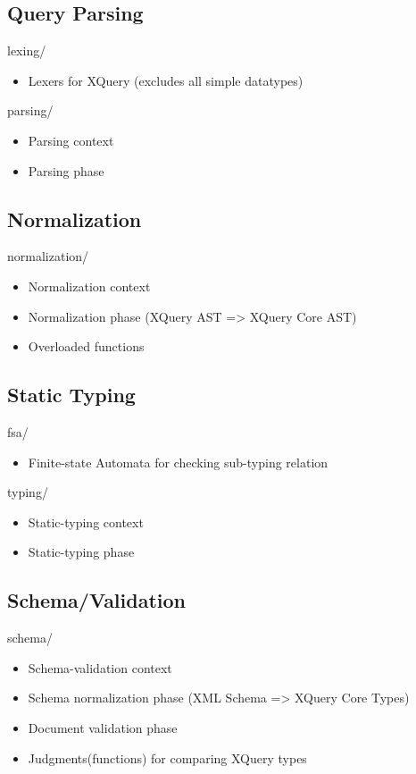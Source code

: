 \subsection{Query Parsing}
lexing/	    
\begin{itemize}
\item    Lexers for XQuery (excludes all simple datatypes)
\end{itemize}
parsing/	 
\begin{itemize}
\item    Parsing context
\item    Parsing phase
\end{itemize}

\subsection{Normalization}
normalization/
\begin{itemize}
\item    Normalization context
\item    Normalization phase (XQuery AST => XQuery Core AST)
\item    Overloaded functions
\end{itemize}

\subsection{Static Typing}

fsa/	    
\begin{itemize}
\item    Finite-state Automata for checking sub-typing relation
\end{itemize}
typing/
\begin{itemize}
\item    Static-typing context
\item    Static-typing phase
\end{itemize}

\subsection{Schema/Validation}
schema/
\begin{itemize}
\item   Schema-validation context
\item   Schema normalization phase (XML Schema => XQuery Core Types)
\item   Document validation phase
\item   Judgments(functions) for comparing XQuery types
\end{itemize}

